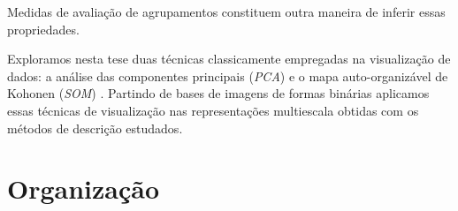 Medidas de avaliação de agrupamentos constituem outra maneira de inferir essas propriedades. 

Exploramos nesta tese duas técnicas classicamente empregadas na visualização de dados: a análise das componentes principais (\emph{PCA}) e o mapa auto-organizável de Kohonen (\textit{SOM}) \cite{Kohonen:1982}. Partindo de bases de imagens de formas binárias aplicamos essas técnicas de visualização nas representações multiescala obtidas com os métodos de descrição estudados.  





\section*{Organização}

